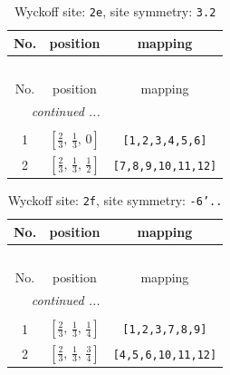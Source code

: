 \documentclass[fleqn,8pt]{jsarticle}
\begin{document}
\begin{longtable}{ccc}
\caption{Wyckoff site: {\tt 2e}, site symmetry: {\tt 3.2}}
 \\
 \hline \hline
No. & position & mapping \\ \hline \endfirsthead

\multicolumn{2}{l}{\tablename\ \thetable{}} \\
 \hline \hline
No. & position & mapping \\ \hline \endhead

 \hline \hline
\multicolumn{2}{r}{\footnotesize\it continued ...} \\ \endfoot

 \hline \hline
\multicolumn{2}{r}{} \\ \endlastfoot

1 & $\left[ \frac{2}{3},\, \frac{1}{3},\, 0 \right]$ & {\tt [1,2,3,4,5,6]} \\ \hline
2 & $\left[ \frac{2}{3},\, \frac{1}{3},\, \frac{1}{2} \right]$ & {\tt [7,8,9,10,11,12]} \\
\end{longtable}
\renewcommand{\arraystretch}{1.2}
\begin{longtable}{ccc}
\caption{Wyckoff site: {\tt 2f}, site symmetry: {\tt -6'..}}
 \\
 \hline \hline
No. & position & mapping \\ \hline \endfirsthead

\multicolumn{2}{l}{\tablename\ \thetable{}} \\
 \hline \hline
No. & position & mapping \\ \hline \endhead

 \hline \hline
\multicolumn{2}{r}{\footnotesize\it continued ...} \\ \endfoot

 \hline \hline
\multicolumn{2}{r}{} \\ \endlastfoot

1 & $\left[ \frac{2}{3},\, \frac{1}{3},\, \frac{1}{4} \right]$ & {\tt [1,2,3,7,8,9]} \\ \hline
2 & $\left[ \frac{2}{3},\, \frac{1}{3},\, \frac{3}{4} \right]$ & {\tt [4,5,6,10,11,12]} \\
\end{longtable}
\renewcommand{\arraystretch}{1.2}
\end{document}
